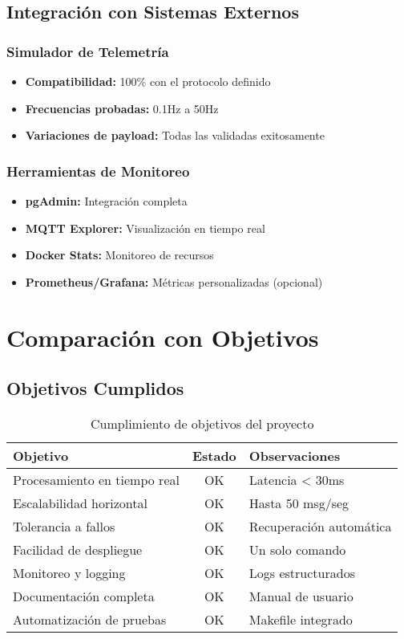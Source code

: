 \subsection{Integración con Sistemas Externos}

\subsubsection{Simulador de Telemetría}
\begin{itemize}
    \item \textbf{Compatibilidad:} 100\% con el protocolo definido
    \item \textbf{Frecuencias probadas:} 0.1Hz a 50Hz
    \item \textbf{Variaciones de payload:} Todas las validadas exitosamente
\end{itemize}

\subsubsection{Herramientas de Monitoreo}
\begin{itemize}
    \item \textbf{pgAdmin:} Integración completa
    \item \textbf{MQTT Explorer:} Visualización en tiempo real
    \item \textbf{Docker Stats:} Monitoreo de recursos
    \item \textbf{Prometheus/Grafana:} Métricas personalizadas (opcional)
\end{itemize}

\section{Comparación con Objetivos}

\subsection{Objetivos Cumplidos}

\begin{table}[H]
\centering
\begin{tabular}{|p{6cm}|c|p{4cm}|}
\hline
\textbf{Objetivo} & \textbf{Estado} & \textbf{Observaciones} \\
\hline
Procesamiento en tiempo real & OK & Latencia < 30ms \\
\hline
Escalabilidad horizontal & OK & Hasta 50 msg/seg \\
\hline
Tolerancia a fallos & OK & Recuperación automática \\
\hline
Facilidad de despliegue & OK & Un solo comando \\
\hline
Monitoreo y logging & OK & Logs estructurados \\
\hline
Documentación completa & OK & Manual de usuario \\
\hline
Automatización de pruebas & OK & Makefile integrado \\
\hline
\end{tabular}
\caption{Cumplimiento de objetivos del proyecto}
\label{tab:objetivos}
\end{table}

